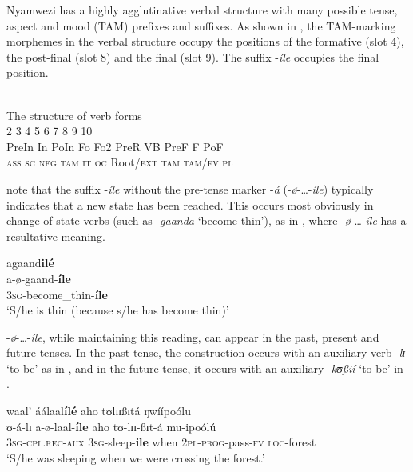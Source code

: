 \documentclass[output=paper,newtxmath,modfonts,nonflat,draftmode]{langsci/langscibook}
\begin{document}
Nyamwezi has a highly agglutinative verbal structure with many possible tense, aspect and mood (TAM) prefixes and suffixes. As shown in , the TAM-marking morphemes in the verbal structure occupy the positions of the formative (slot 4), the post-final (slot 8) and the final (slot 9). The suffix -\textit{íle} occupies the final position. 

\ea \label{ex:kanijo:3}
\\
The structure of verb forms\\
  2  3  4  5  6  7  8  9  10\\
PreIn  In    PoIn      Fo     Fo2    PreR    VB     PreF     F        PoF\\
\textsc{ass} \textsc{sc} \textsc{neg}  \textsc{tam} \textsc{it} \textsc{oc}   Root/\textsc{ext} \textsc{tam}  \textsc{tam}/\textsc{fv}  \textsc{pl}\\
\z


\citet{Maganga1992} note that the suffix -\textit{íle} without the pre-tense marker -\textit{á} (-\textit{ø}-…-\textit{íle}) typically indicates that a new state has been reached. This occurs most obviously in change-of-state verbs (such as -\textit{gaanda} ‘become thin’), as in , where -\textit{ø}-…-\textit{íle} has a resultative meaning. 

\ea \label{ex:kanijo:4}
\glll agaand\textbf{ilé}\\
a-ø-gaand-\textbf{íle}\\
\textsc{3sg}-become\_thin-\textbf{íle}\\
\glt ‘S/he is thin (because s/he has become thin)’
\z

-\textit{ø}-\ldots-\textit{íle}, while maintaining this reading, can appear in the past, present and future tenses. In the past tense, the construction occurs with an auxiliary verb -\textit{l}{\textit{ɪ}} ‘to be’ as in , and in the future tense, it occurs with an auxiliary -\textit{kʊßií} ‘to be’ in . 

\ea \label{ex:kanijo:5}
\glll waal’    áálaal\textbf{ílé}   aho   tʊlɪɪßɪtá     ŋwíípoólu\\
ʊ-á-lɪ           a-ø-laal-\textbf{íle}     aho   tʊ-lɪɪ-ßɪt-á      mu-ipoólú\\
\textsc{3sg}-\textsc{cpl}.\textsc{rec}-\textsc{aux} \textsc{3sg}-sleep-\textbf{ile} when \textsc{2pl}-\textsc{prog}-pass-\textsc{fv} \textsc{loc}-forest\\
\glt ‘S/he was sleeping when we were crossing the forest.’
\z
\end{document}
